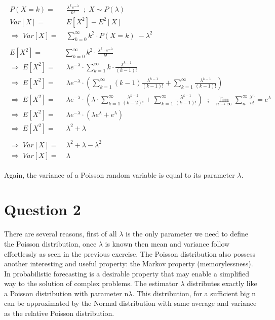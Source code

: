 \begin{align}
    \begin{split}
        P(X=k) =& \; \frac{\lambda^k e^{-\lambda}}{k!} \;\; ; \; X \sim P(\lambda) \\
        Var[X] =& \; E[X^2] - E^2[X] \\
        \Rightarrow \; Var[X] =& \; \sum_{k=0}^{\infty} k^2 \cdot P(X=k) \; - \lambda^2 \\ \\
        E[X^2] =& \sum_{k=0}^{\infty} k^2 \cdot \frac{\lambda^k \cdot e^{-\lambda}}{k!} \\
        \Rightarrow \; E[X^2] =& \; \lambda e^{-\lambda} \cdot \sum_{k=1}^{\infty} k \cdot \frac{\lambda^{k-1}}{(k-1)!} \\
        \Rightarrow \; E[X^2] =& \; \lambda e^{-\lambda} \cdot \left( \sum_{k=1}^{\infty} (k-1) \frac{\lambda^{k-1}}{(k-1)!} + \sum_{k=1}^{\infty} \frac{\lambda^{k-1}}{(k-1)!} \right) \\
        \Rightarrow \; E[X^2] =& \; \lambda e^{-\lambda} \cdot \left( \lambda \cdot \sum_{k=1}^{\infty} \frac{\lambda^{k-2}}{(k-2)!} + \sum_{k=1}^{\infty} \frac{\lambda^{k-1}}{(k-1)!} \right) \;\; ; \;\; \lim_{n \to \infty} \sum_{n}^{\infty} \frac{\lambda^n}{n!} = e^{\lambda} \\
        \Rightarrow \; E[X^2] =& \; \lambda e^{-\lambda} \cdot (\lambda e^{\lambda} + e^{\lambda}) \\
        \Rightarrow \; E[X^2] =& \; \lambda^2 + \lambda \\ \\
        \Rightarrow \; Var[X] =& \; \lambda^2 + \lambda - \lambda^2 \\
        \Rightarrow \; Var[X] =& \; \lambda
    \end{split}
\end{align}

Again, the variance of a Poisson random variable is equal to its parameter $\lambda$.

\section{Question 2}
There are several reasons, first of all $\lambda$ is the only parameter we need to define the Poisson distribution, once $\lambda$ is known then mean and variance follow effortlessly as seen in the previous exercise.
The Poisson distribution also possess another interesting and useful property: the Markov property (memorylessness). In probabilistic forecasting is a desirable property that may enable a simplified way to the solution of complex problems.
The estimator $\lambda$ distributes exactly like a Poisson distribution with parameter n$\lambda$. This distribution, for a sufficient big n can be approximated by the Normal distribution with same average and variance as the relative Poisson distribution.

